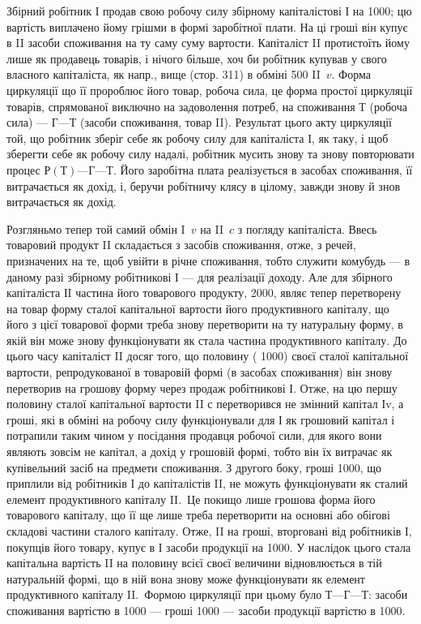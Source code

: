 
Збірний робітник І продав свою робочу силу збірному капіталістові
І на 1000; цю вартість виплачено йому грішми в формі заробітної плати.
На ці гроші він купує в II засоби споживання на ту саму суму
вартости. Капіталіст II протистоїть йому лише як продавець товарів, і
нічого більше, хоч би робітник купував у свого власного капіталіста, як
напр., вище (стор. 311) в обміні 500 II~$v$. Форма циркуляції що її пророблює
його товар, робоча сила, це форма простої циркуляції товарів, спрямованої
виключно на задоволення потреб, на споживання $Т$ (робоча сила) —
$Г — Т$ (засоби споживання, товар II). Результат цього акту циркуляції
той, що робітник зберіг себе як робочу силу для капіталіста І, як таку,
і щоб зберегти себе як робочу силу надалі, робітник мусить знову та
знову повторювати процес $Р (Т) — Г — Т$. Його заробітна плата реалізується
в засобах споживання, її витрачається як дохід, і, беручи
робітничу клясу в цілому, завжди знову й знов витрачається як дохід.

Розгляньмо тепер той самий обмін I~$v$ на II~$c$ з погляду капіталіста. Ввесь
товаровий продукт II складається з засобів споживання, отже, з речей,
призначених на те, щоб увійти в річне споживання, тобто служити комубудь
— в даному разі збірному робітникові І — для реалізації доходу. Але
для збірного капіталіста ІI частина його товарового продукту, \deq{} 2000,
являє тепер перетворену на товар форму сталої капітальної вартости
його продуктивного капіталу, що його з цієї товарової форми треба
знову перетворити на ту натуральну форму, в якій він може знову
функціонувати як стала частина продуктивного капіталу. До цього часу
капіталіст II досяг того, що половину (\deq{} 1000) своєї сталої капітальної
вартости, репродукованої в товаровій формі (в засобах споживання) він
знову перетворив на грошову форму через продаж робітникові І. Отже,
на цю першу половину сталої капітальної вартости II с перетворився не
змінний капітал Іv, а гроші, які в обміні на робочу силу функціонували
для І як грошовий капітал і потрапили таким чином у посідання продавця
робочої сили, для якого вони являють зовсім не капітал, а дохід
у грошовій формі, тобто він їх витрачає як купівельний засіб на предмети
споживання. З другого боку, гроші \deq{} 1000, що приплили від робітників
І до капіталістів II, не можуть функціонувати як сталий елемент
продуктивного капіталу II.~Це покищо лише грошова форма його товарового
капіталу, що її ще лише треба перетворити на основні або обігові
складові частини сталого капіталу. Отже, II на гроші, вторговані від
робітників І, покупців його товару, купує в І засоби продукції на 1000.
У наслідок цього стала капітальна вартість II на половину всієї своєї
величини відновлюється в тій натуральній формі, що в ній вона знову
може функціонувати як елемент продуктивного капіталу II.~Формою
циркуляції при цьому було $Т — Г — Т$: засоби споживання вартістю в 1000 —
гроші \deq{} 1000 — засоби продукції вартістю в 1000.

